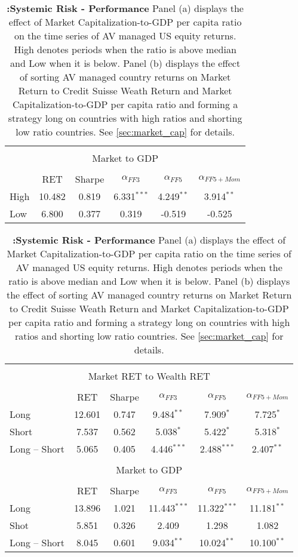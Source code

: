 \begin{table}[!htbp]
	\centering \caption{\textbf{:Systemic Risk - Performance} \newline
		\footnotesize{Panel (a) displays the effect of  Market Capitalization-to-GDP per capita ratio on the time series of AV managed US equity returns. High denotes periods when the ratio is above median and Low when it is below.
Panel (b) displays the effect of sorting AV managed country returns on Market Return to Credit Suisse Weath Return and Market Capitalization-to-GDP per capita ratio and forming a strategy long on countries with high ratios and shorting low ratio countries. See \ref{sec:market_cap} for details.}}
	\label{tab:tab_sub_performance}
	\begin{adjustbox}{width=\textwidth,max height=.43\totalheight}
		\begin{tabular}{lccccc}
			\hline\\[-1.8ex]
			\multicolumn{6}{c}{Market to GDP}\\
			\hline\\[-1.8ex]
			& RET & Sharpe & $\alpha_{FF3}$ & $\alpha_{FF5}$ & $\alpha_{FF5+Mom}$ \\
			\cline{2-6}
High& 10.482 &0.819 &6.331$^{***}$&  4.249$^{**}$ &  3.914$^{**}$\\
Low  & 6.800& 0.377 & 0.319 & -0.519 & -0.525 \\
			\hline
		\end{tabular}
	\end{adjustbox}
	\begin{adjustbox}{width=\textwidth,max height=.43\totalheight}
	\begin{tabular}{lccccc}
		\hline\\[-1.8ex]
		\multicolumn{6}{c}{Market RET to Wealth RET}\\
		\hline\\[-1.8ex]
		& RET & Sharpe & $\alpha_{FF3}$ & $\alpha_{FF5}$ & $\alpha_{FF5+Mom}$ \\
		\cline{2-6}
		Long & 12.601 & 0.747 & 9.484$^{**}$ & 7.909$^{*}$ & 7.725$^{*}$ \\
		Short & 7.537 & 0.562 & 5.038$^{*}$ & 5.422$^{*}$ & 5.318$^{*}$ \\
		Long $–$ Short & 5.065 & 0.405 & 4.446$^{***}$ & 2.488$^{***}$ & 2.407$^{**}$ \\
		\hline\\[-1.8ex]
		\multicolumn{6}{c}{Market to GDP}\\
		\hline\\[-1.8ex]
		 & RET & Sharpe & $\alpha_{FF3}$ & $\alpha_{FF5}$ & $\alpha_{FF5+Mom}$ \\
		 \cline{2-6}
		Long & 13.896 & 1.021 & 11.443$^{***}$ & 11.322$^{***}$ & 11.181$^{**}$ \\
		Shot & 5.851 & 0.326 & 2.409 & 1.298 & 1.082 \\
		Long $–$ Short & 8.045 & 0.601 & 9.034$^{**}$ & 10.024$^{**}$ & 10.100$^{**}$\\
		\hline
	\end{tabular}
	\end{adjustbox}
	
\end{table}